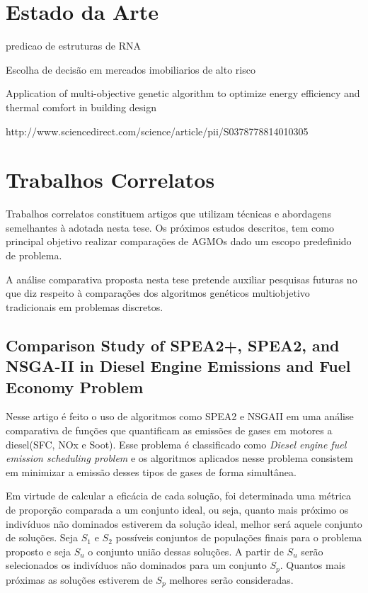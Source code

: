 \documentclass[]{article}
\begin{document}
\section{Estado da Arte}
	
	predicao de estruturas de RNA
		    
 	Escolha de decisão em mercados imobiliarios de alto risco
  
 	Application of multi-objective genetic algorithm to optimize energy efficiency and thermal comfort in building design
  
 	http://www.sciencedirect.com/science/article/pii/S0378778814010305
	
	
\section{Trabalhos Correlatos}
	
	Trabalhos correlatos constituem artigos que utilizam técnicas e abordagens semelhantes à adotada nesta tese. Os próximos estudos descritos, tem como principal objetivo realizar comparações de AGMOs dado um escopo predefinido de problema.
	 
	A análise comparativa proposta nesta tese pretende auxiliar pesquisas futuras no que diz respeito à comparações dos algoritmos genéticos multiobjetivo tradicionais em problemas discretos.
	
    \subsection{Comparison Study of SPEA2+, SPEA2, and NSGA-II in Diesel Engine Emissions and Fuel Economy Problem}
    
    Nesse artigo\cite{SPEA2ComparisonNSGAII} é feito o uso de algoritmos como SPEA2 e NSGAII em uma análise comparativa de funções que quantificam as emissões de gases em motores a diesel(SFC, NOx e Soot). Esse problema é classificado como \textit{Diesel engine fuel emission scheduling problem} e os algoritmos aplicados nesse problema consistem em minimizar a emissão desses tipos de gases de forma simultânea.
    
    Em virtude de calcular a eficácia de cada solução, foi determinada uma métrica de proporção comparada a um conjunto ideal, ou seja, quanto mais próximo os indivíduos não dominados estiverem da solução ideal, melhor será aquele conjunto de soluções. Seja $S_1$ e $S_2$ possíveis conjuntos de populações finais para o problema proposto e seja $S_u$ o conjunto união dessas soluções. A partir de $S_u$ serão selecionados os indivíduos não dominados para um conjunto $S_p$. Quantos mais próximas as soluções estiverem de $S_p$ melhores serão consideradas.
    
\end{document}

